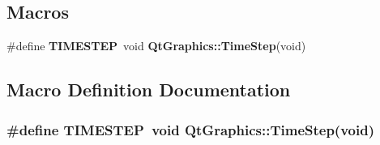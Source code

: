 \subsection*{Macros}
\begin{DoxyCompactItemize}
\item 
\#define {\bf T\-I\-M\-E\-S\-T\-E\-P}~void {\bf Qt\-Graphics\-::\-Time\-Step}(void)
\end{DoxyCompactItemize}


\subsection{Macro Definition Documentation}
\subsubsection[{T\-I\-M\-E\-S\-T\-E\-P}]{\setlength{\rightskip}{0pt plus 5cm}\#define T\-I\-M\-E\-S\-T\-E\-P~void {\bf Qt\-Graphics\-::\-Time\-Step}(void)}\label{qtgraph_8h_a68ee019dafc12ee47d427cda7f17713e}
